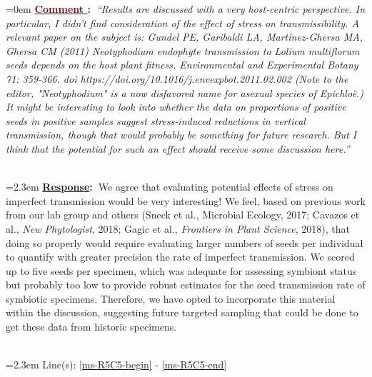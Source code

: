 \documentclass[12pt]{article}
\newcounter{cN}
\newcommand{\comment}[1]{
	\vspace{2em}
	\refstepcounter{cN} %
	\noindent \hangindent=0em \textbf{\textcolor{Maroon}{\uline{Comment \thecN}:~}}\emph{``#1''}
	}
\newcommand{\response}[1]{
	\\[0.25em]
	\hangindent=2.3em \textbf{\textcolor{NavyBlue}{\uline{Response}:~}}#1
	}
\newcommand{\linesref}[2]{
		\\[0.25em]
	\hangindent=2.3em {\color{Mahogany} Line(s): \ref{#1} - \ref{#2}}
}
\begin{document}
\comment{Results are discussed with a very host-centric perspective. In particular, I didn't find consideration of the effect of stress on transmissibility. A relevant paper on the subject is: Gundel PE, Garibaldi LA, Martínez-Ghersa MA, Ghersa CM (2011) Neotyphodium endophyte transmission to Lolium multiflorum seeds depends on the host plant fitness. Environmental and Experimental Botany 71: 359-366. doi https://doi.org/10.1016/j.envexpbot.2011.02.002 (Note to the editor, "Neotyphodium" is a now disfavored name for asexual species of Epichloë.) It might be interesting to look into whether the data on proportions of positive seeds in positive samples suggest stress-induced reductions in vertical transmission, though that would probably be something for future research. But I think that the potential for such an effect should receive some discussion here.}
\response{We agree that evaluating potential effects of stress on imperfect transmission would be very interesting! We feel, based on previous work from our lab group and others (Sneck et al., {Microbial Ecology}, 2017; Cavazos et al., \emph{New Phytologist}, 2018; Gagic et al., \emph{Frontiers in Plant Science}, 2018), that doing so properly would require evaluating larger numbers of seeds per individual to quantify with greater precision the rate of imperfect transmission. 
We scored up to five seeds per specimen, which was adequate for assessing symbiont status but probably too low to provide robust estimates for the seed transmission rate of symbiotic specimens. 
Therefore, we have opted to incorporate this material within the discussion, suggesting future targeted sampling that could be done to get these data from historic specimens.}
\linesref{ms-R5C5-begin}{ms-R5C5-end}
\end{document}
